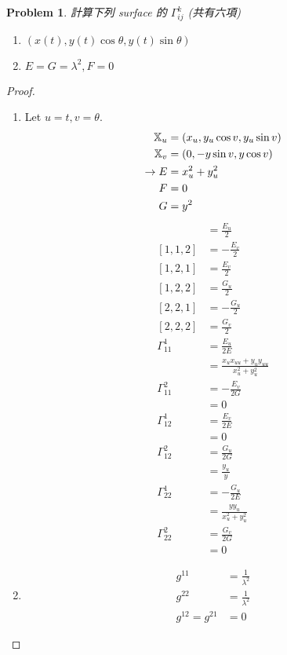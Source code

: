 \documentclass[10pt,a4paper]{article}
\newcounter{theProblemCounter}
\newtheorem{problem}[theProblemCounter]{Problem}
\begin{document}
\setcounter{theProblemCounter}{6}
\begin{problem}
計算下列 surface 的 $\Gamma_{ij}^k$ (共有六項)
\begin{enumerate}
\item[(b)]
$(x(t),y(t)\cos\theta,y(t)\sin\theta)$
\item[(c)]
$E=G=\lambda^2, F=0$
\end{enumerate}
\end{problem}
\begin{proof}
\begin{enumerate}
\item[(b)]
Let $u=t, v=\theta$.
\begin{align*}
\mathbb{X}_u&=(x_u,y_u\cos v,y_u\sin v)\\
\mathbb{X}_v&=(0,-y\sin v,y\cos v)\\
\rightarrow E&=x_u^2+y_u^2\\
F&=0\\
G&=y^2\\
\end{align*}
\begin{align*}
[1,1,1]&=\frac{E_u}{2}\\
[1,1,2]&=-\frac{E_v}{2}\\
[1,2,1]&=\frac{E_v}{2}\\
[1,2,2]&=\frac{G_u}{2}\\
[2,2,1]&=-\frac{G_u}{2}\\
[2,2,2]&=\frac{G_v}{2}\\
\Gamma_{11}^1&=\frac{E_u}{2E}\\
&=\frac{x_ux_{uu}+y_uy_{uu}}{x_u^2+y_u^2}\\
\Gamma_{11}^2&=-\frac{E_v}{2G}\\
&=0\\
\Gamma_{12}^1&=\frac{E_v}{2E}\\
&=0\\
\Gamma_{12}^2&=\frac{G_u}{2G}\\
&=\frac{y_u}{y}\\
\Gamma_{22}^1&=-\frac{G_u}{2E}\\
&=\frac{yy_u}{x_u^2+y_u^2}\\
\Gamma_{22}^2&=\frac{G_v}{2G}\\
&=0
\end{align*}
\item[(c)]
\begin{align*}
g^{11}&=\frac{1}{\lambda^2}\\
g^{22}&=\frac{1}{\lambda^2}\\
g^{12}=g^{21}&=0
\end{align*}

\end{enumerate}
\end{proof}
\end{document}

